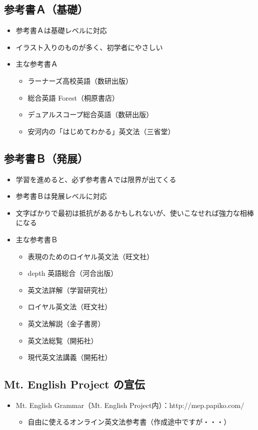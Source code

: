 \documentclass[titlepage]{jsarticle}
\begin{document}
  \subsection*{参考書Ａ（基礎）}
  \begin{itemize}
   \item 参考書Ａは基礎レベルに対応
   \item イラスト入りのものが多く、初学者にやさしい
   \item 主な参考書Ａ
         \begin{itemize}
          \item ラーナーズ高校英語（数研出版）
          \item 総合英語 Forest（桐原書店）
          \item デュアルスコープ総合英語（数研出版）
          \item 安河内の「はじめてわかる」英文法（三省堂）
         \end{itemize}
  \end{itemize}

  \subsection*{参考書Ｂ（発展）}
  \begin{itemize}
   \item 学習を進めると、必ず参考書Ａでは限界が出てくる
   \item 参考書Ｂは発展レベルに対応
   \item 文字ばかりで最初は抵抗があるかもしれないが、使いこなせれば強力な相棒になる
   \item 主な参考書Ｂ
         \begin{itemize}
          \item 表現のためのロイヤル英文法（旺文社）
          \item depth 英語総合（河合出版）
          \item 英文法詳解（学習研究社）
          \item ロイヤル英文法（旺文社）
          \item 英文法解説（金子書房）
          \item 英文法総覧（開拓社）
          \item 現代英文法講義（開拓社）
         \end{itemize}
  \end{itemize}
  \subsection*{Mt. English Project の宣伝}
  \begin{itemize}
   \item Mt. English Grammar（Mt. English Project内）：http://mep.papiko.com/
         \begin{itemize}
          \item 自由に使えるオンライン英文法参考書（作成途中ですが・・・）
         \end{itemize}
  \end{itemize}
\end{document}

